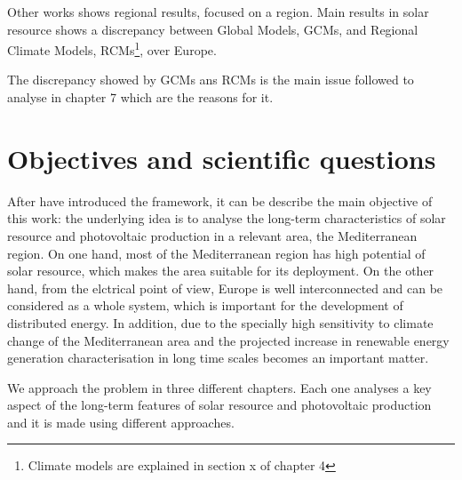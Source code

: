 Other works shows regional results, focused on a region. Main results in solar resource shows a discrepancy between Global Models, GCMs, and Regional Climate Models, RCMs\footnote{Climate models are explained in section x of chapter 4}, over Europe.

The discrepancy showed by GCMs ans RCMs is the main issue followed to analyse in chapter 7 which are the reasons for it.

\section{Objectives and scientific questions}%


After have introduced the framework, it can be describe the main objective of this work: the underlying idea is to analyse the long-term characteristics of solar resource and photovoltaic production in a relevant area, the Mediterranean region. On one hand, most of the Mediterranean region has high potential of solar resource, which makes the area suitable for its deployment. On the other hand, from the elctrical point of view, Europe is well interconnected and can be considered as a whole system, which is important for the development of distributed energy. In addition, due to the specially high sensitivity to climate change of the Mediterranean area and the projected increase in renewable energy generation characterisation in long time scales becomes an important matter.

We approach the problem in three different chapters. Each one analyses a key aspect of the long-term features of solar resource and photovoltaic production and it is made using different approaches.

